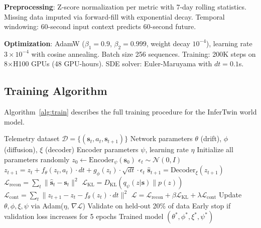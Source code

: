 \documentclass[conference,10pt]{IEEEtran}
\begin{document}
\textbf{Preprocessing}: Z-score normalization per metric with 7-day rolling statistics. Missing data imputed via forward-fill with exponential decay. Temporal windowing: 60-second input context predicts 60-second future.

\textbf{Optimization}: AdamW ($\beta_1{=}0.9$, $\beta_2{=}0.999$, weight decay $10^{-4}$), learning rate $3 \times 10^{-4}$ with cosine annealing. Batch size 256 sequences. Training: 200K steps on 8$\times$H100 GPUs (48 GPU-hours). SDE solver: Euler-Maruyama with $dt{=}0.1$s.



\subsection{Training Algorithm}

Algorithm~\ref{alg:train} describes the full training procedure for the InferTwin world model.

\begin{algorithm}[!t]
\caption{InferTwin World Model Training}
\label{alg:train}
\begin{algorithmic}[1]
\Require Telemetry dataset $\mathcal{D} = \{(\mathbf{s}_t, a_t, \mathbf{s}_{t+1})\}$
\Require Network parameters $\theta$ (drift), $\phi$ (diffusion), $\xi$ (decoder)
\Require Encoder parameters $\psi$, learning rate $\eta$
\State Initialize all parameters randomly
        \State $z_0 \leftarrow \text{Encoder}_\psi(\mathbf{s}_0)$ 
            \State $\epsilon_t \sim \mathcal{N}(0, I)$ 
            \State $z_{t+1} = z_t + f_\theta(z_t, a_t) \cdot dt + g_\phi(z_t) \cdot \sqrt{dt} \cdot \epsilon_t$
            \State $\hat{\mathbf{s}}_{t+1} = \text{Decoder}_\xi(z_{t+1})$
        \EndFor
        \State $\mathcal{L}_{\text{recon}} = \sum_t \|\hat{\mathbf{s}}_t - \mathbf{s}_t\|^2$ 
        \State $\mathcal{L}_{\text{KL}} = D_{\text{KL}}(q_\psi(z|\mathbf{s}) \| p(z))$ 
        \State $\mathcal{L}_{\text{cont}} = \sum_t \|z_{t+1} - z_t - f_\theta(z_t) \cdot dt\|^2$ 
        \State $\mathcal{L} = \mathcal{L}_{\text{recon}} + \beta \mathcal{L}_{\text{KL}} + \lambda \mathcal{L}_{\text{cont}}$
        \State Update $\theta, \phi, \xi, \psi$ via Adam($\eta$, $\nabla \mathcal{L}$)
    \EndFor
    \State Validate on held-out 20\% of data
    \State Early stop if validation loss increases for 5 epochs
\EndFor
\State \Return Trained model $(\theta^*, \phi^*, \xi^*, \psi^*)$
\end{algorithmic}
\end{algorithm}
\end{document}
